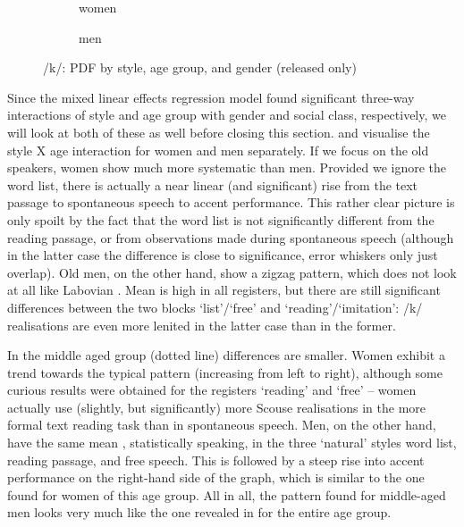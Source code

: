 \begin{figure}
	
	\begin{subfigure}{.49\textwidth}
		
			\resizebox{\linewidth}{!}{} 
		\caption{women}
		\label{fig.line.k.fem}
	\end{subfigure}
	\begin{subfigure}{.49\textwidth}
		
			\resizebox{\linewidth}{!}{} 
		\caption{men}
		\label{fig.line.k.mal}
	\end{subfigure}
	\caption{/k/: PDF by style, age group, and gender (released only)}
\end{figure}

Since the mixed linear effects regression model found significant three-way interactions of style and age group with gender and social class, respectively, we will look at both of these as well before closing this section.
 and  visualise the style X age interaction for women and men separately.
If we focus on the old speakers, women show much more systematic  than men.
Provided we ignore the word list, there is actually a near linear (and significant) rise from the text passage to spontaneous speech to accent performance.
This rather clear picture is only spoilt by the fact that the word list is not significantly different from the reading passage, or from observations made during spontaneous speech (although in the latter case the difference is close to significance, error whiskers only just overlap).
Old men, on the other hand, show a zigzag pattern, which does not look at all like Labovian .
Mean  is high in all registers, but there are still significant differences between the two blocks `list'/`free' and `reading'/`imitation': /k/ realisations are even more lenited in the latter case than in the former.

In the middle aged group (dotted line) differences are smaller.
Women exhibit a trend towards the typical  pattern (increasing  from left to right), although some curious results were obtained for the registers `reading' and `free' -- women actually use (slightly, but significantly) more Scouse realisations in the more formal text reading task than in spontaneous speech.
Men, on the other hand, have the same mean , statistically speaking, in the three `natural' styles word list, reading passage, and free speech.
This is followed by a steep rise into accent performance on the right-hand side of the graph, which is similar to the one found for women of this age group.
All in all, the pattern found for middle-aged men looks very much like the one revealed in  for the entire age group.

